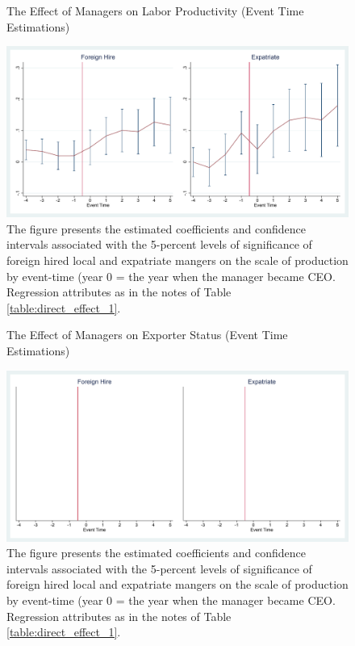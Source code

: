 \documentclass[12pt,a4paper]{article}
\begin{document}
\begin{figure}
\center
\caption{The Effect of Managers on Labor Productivity (Event Time Estimations)}
\label{figure:dynamics_lnQL}
\includegraphics[width=15cm]{Regression/gr_lnQL.pdf}
\caption*{The figure presents the estimated coefficients and confidence intervals associated with the 5-percent levels of significance of foreign hired local and expatriate mangers on the scale of production by event-time (year 0 = the year when the manager became CEO. Regression attributes as in the notes of Table \ref{table:direct_effect_1}.}
\end{figure}

\begin{figure}
\caption{The Effect of Managers on Exporter Status (Event Time Estimations)}
\label{figure:dynamics_exporter_5}
\center
\includegraphics[width=15cm]{Regression/gr_exporter_5.pdf}
\caption*{The figure presents the estimated coefficients and confidence intervals associated with the 5-percent levels of significance of foreign hired local and expatriate mangers on the scale of production by event-time (year 0 = the year when the manager became CEO. Regression attributes as in the notes of Table \ref{table:direct_effect_1}.  }
\end{figure}
\end{document}
